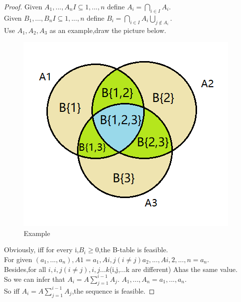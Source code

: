 \documentclass[12pt,a4]{article}
\theoremstyle{exercise}
\begin{document}
\begin{proof}
Given $A_1,...,A_n I\subseteq{1,...,n}$ define $A_i=\bigcap\limits_{i \in I} A_i$.
\\Given $B_1,...,B_n I\subseteq{1,...,n}$ define $B_i=\bigcap\limits_{i \in I} A_i\bigcup \limits_{j \notin A_i}$.
\\Use $A_1,A_2,A_3$ as an example,draw the picture below.
 \begin{figure}[H]
	\begin{center}
		\includegraphics[width=0.32\linewidth]{Exercise33-1.png}
		\caption{Example}
		\label{Fig:3}
	\end{center}
	\vspace{-0.5em}
    \end{figure}
    Obviously, iff for every i,$B_i \geq 0$,the B-table is feasible.
    \\For given $(a_1,...,a_n),A{1}=a_1,A{i,j}(i\not=j)a_2,...,A{i,2,...,n}=a_n$.
    \\Besides,for all ${i},{i,j}(i \not=j),{i,j...k}$(i,j,...k are different) A{}has the same value.
    \\So we can infer that $A_i=A\sum_{j=1}^{i-1}A_j$.
    ${A_1,...,A_n}={a_1,...,a_n}$.
    \\So iff $A_i=A\sum_{j=1}^{i-1}A_j$,the sequence is feasible.
\end{proof}
\end{document}
